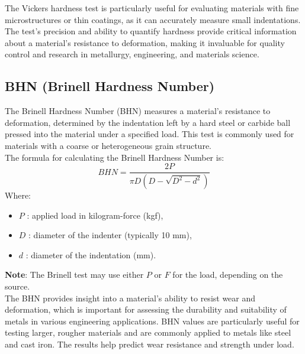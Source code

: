 \documentclass{article}
\begin{document}
The Vickers hardness test is particularly useful for evaluating materials with fine microstructures or thin coatings, as it can accurately measure small indentations. The test’s precision and ability to quantify hardness provide critical information about a material’s resistance to deformation, making it invaluable for quality control and research in metallurgy, engineering, and materials science.  

\newpage
\subsection{BHN (Brinell Hardness Number)}
The Brinell Hardness Number (BHN) measures a material's resistance to deformation, determined by the indentation left by a hard steel or carbide ball pressed into the material under a specified load. This test is commonly used for materials with a coarse or heterogeneous grain structure.\\[1em]
The formula for calculating the Brinell Hardness Number is:
\begin{equation}
    BHN = \frac{2P}{\pi D (D - \sqrt{D^2 - d^2})}
\end{equation}
Where:
\begin{itemize}[itemsep=-1mm]
    \item \( P \) : applied load in kilogram-force (kgf),
    \item \( D \) : diameter of the indenter (typically 10 mm),
    \item \( d \) : diameter of the indentation (mm).
\end{itemize}
\textbf{Note}: The Brinell test may use either $P$ or $F$ for the load, depending on the source.\\ 
The BHN provides insight into a material's ability to resist wear and deformation, which is important for assessing the durability and suitability of metals in various engineering applications. BHN values are particularly useful for testing larger, rougher materials and are commonly applied to metals like steel and cast iron. The results help predict wear resistance and strength under load.
\end{document}
